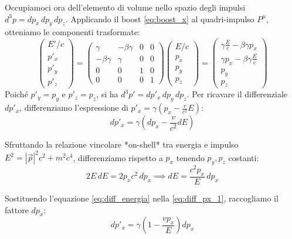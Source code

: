 \documentclass[11pt, a4paper, oneside]{scrreprt}
\begin{document}
Occupiamoci ora dell'elemento di volume nello spazio degli impulsi $d^3p = dp_x \, dp_y \, dp_z$. Applicando il boost \eqref{eq:boost_x} al quadri-impulso $P^\mu$, otteniamo le componenti trasformate:
\begin{equation} \label{eq:boost_quadrimpulso}
    \begin{pmatrix}
        E'/c \\
        p'_x \\
        p'_y \\
        p'_z
    \end{pmatrix}
    =
    \begin{pmatrix}
        \gamma & -\beta\gamma & 0 & 0 \\
        -\beta\gamma & \gamma & 0 & 0 \\
        0 & 0 & 1 & 0 \\
        0 & 0 & 0 & 1
    \end{pmatrix}
    \begin{pmatrix}
        E/c \\
        p_x \\
        p_y \\
        p_z
    \end{pmatrix}
    =
    \begin{pmatrix}
        \gamma \frac{E}{c} - \beta\gamma p_x \\
        \gamma p_x - \beta\gamma \frac{E}{c} \\
        p_y \\
        p_z
    \end{pmatrix}
\end{equation}
Poiché $p'_y = p_y$ e $p'_z = p_z$, si ha $d^3p' = dp'_x \, dp_y \, dp_z$. Per ricavare il differenziale $dp'_x$, differenziamo l'espressione di $p'_x = \gamma \left( p_x - \frac{v}{c^2} E \right)$:
\begin{equation} \label{eq:diff_px_1}
    dp'_x = \gamma \left( dp_x - \frac{v}{c^2} dE \right)
\end{equation}

Sfruttando la relazione vincolare *on-shell* tra energia e impulso $E^2 = |\vec{p}|^2 c^2 + m^2 c^4$, differenziamo rispetto a $p_x$ tenendo $p_y, p_z$ costanti:
\begin{equation} \label{eq:diff_energia}
    2E \, dE = 2 p_x c^2 \, dp_x \implies dE = \frac{c^2 p_x}{E} \, dp_x
\end{equation}

Sostituendo l'equazione \eqref{eq:diff_energia} nella \eqref{eq:diff_px_1}, raccogliamo il fattore $dp_x$:
\begin{equation}
    dp'_x = \gamma \left( 1 - \frac{v p_x}{E} \right) dp_x
\end{equation}
\end{document}
